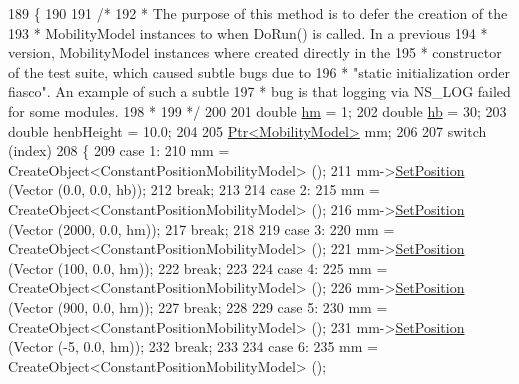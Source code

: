 \begin{DoxyCode}
189 \{
190 
191   \textcolor{comment}{/*}
192 \textcolor{comment}{   * The purpose of this method is to defer the creation of the}
193 \textcolor{comment}{   * MobilityModel instances to when DoRun() is called. In a previous}
194 \textcolor{comment}{   * version, MobilityModel instances where created directly in the}
195 \textcolor{comment}{   * constructor of the test suite, which caused subtle bugs due to}
196 \textcolor{comment}{   * "static initialization order fiasco". An example of such a subtle}
197 \textcolor{comment}{   * bug is that logging via NS\_LOG failed for some modules.}
198 \textcolor{comment}{   * }
199 \textcolor{comment}{   */}
200 
201   \textcolor{keywordtype}{double} \hyperlink{buildings__pathloss_8m_adf48bfd0f3afa8972e753a0f895b0a51}{hm} = 1;
202   \textcolor{keywordtype}{double} \hyperlink{buildings__pathloss_8m_a2893d16f4bf2bcf4555002c045e565b9}{hb} = 30;
203   \textcolor{keywordtype}{double} henbHeight = 10.0;
204 
205   \hyperlink{classns3_1_1Ptr}{Ptr<MobilityModel>} mm;
206   
207   \textcolor{keywordflow}{switch} (index)
208     \{
209     \textcolor{keywordflow}{case} 1:
210       mm = CreateObject<ConstantPositionMobilityModel> ();
211       mm->\hyperlink{classns3_1_1MobilityModel_ac584b3d5a309709d2f13ed6ada1e7640}{SetPosition} (Vector (0.0, 0.0, hb));
212       \textcolor{keywordflow}{break};
213 
214     \textcolor{keywordflow}{case} 2:
215       mm = CreateObject<ConstantPositionMobilityModel> ();
216       mm->\hyperlink{classns3_1_1MobilityModel_ac584b3d5a309709d2f13ed6ada1e7640}{SetPosition} (Vector (2000, 0.0, hm));
217       \textcolor{keywordflow}{break};
218 
219     \textcolor{keywordflow}{case} 3:
220       mm = CreateObject<ConstantPositionMobilityModel> ();
221       mm->\hyperlink{classns3_1_1MobilityModel_ac584b3d5a309709d2f13ed6ada1e7640}{SetPosition} (Vector (100, 0.0, hm));
222       \textcolor{keywordflow}{break};
223 
224     \textcolor{keywordflow}{case} 4:
225       mm = CreateObject<ConstantPositionMobilityModel> ();
226       mm->\hyperlink{classns3_1_1MobilityModel_ac584b3d5a309709d2f13ed6ada1e7640}{SetPosition} (Vector (900, 0.0, hm));
227       \textcolor{keywordflow}{break};
228 
229     \textcolor{keywordflow}{case} 5:
230       mm = CreateObject<ConstantPositionMobilityModel> ();
231       mm->\hyperlink{classns3_1_1MobilityModel_ac584b3d5a309709d2f13ed6ada1e7640}{SetPosition} (Vector (-5, 0.0, hm));
232       \textcolor{keywordflow}{break};
233 
234     \textcolor{keywordflow}{case} 6:
235       mm = CreateObject<ConstantPositionMobilityModel> ();

\end{DoxyCode}
